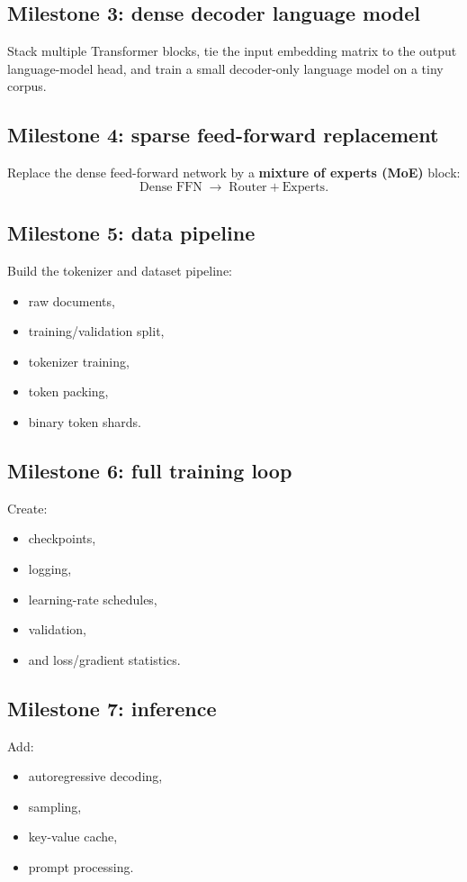 \documentclass[11pt]{article}
\begin{document}
\subsection*{Milestone 3: dense decoder language model}
Stack multiple Transformer blocks, tie the input embedding matrix to the output
language-model head, and train a small decoder-only language model on a tiny corpus.

\subsection*{Milestone 4: sparse feed-forward replacement}
Replace the dense feed-forward network by a \textbf{mixture of experts (MoE)} block:
\[
\text{Dense FFN} \;\longrightarrow\; \text{Router} + \text{Experts}.
\]

\subsection*{Milestone 5: data pipeline}
Build the tokenizer and dataset pipeline:
\begin{itemize}[leftmargin=1.5em]
    \item raw documents,
    \item training/validation split,
    \item tokenizer training,
    \item token packing,
    \item binary token shards.
\end{itemize}

\subsection*{Milestone 6: full training loop}
Create:
\begin{itemize}[leftmargin=1.5em]
    \item checkpoints,
    \item logging,
    \item learning-rate schedules,
    \item validation,
    \item and loss/gradient statistics.
\end{itemize}

\subsection*{Milestone 7: inference}
Add:
\begin{itemize}[leftmargin=1.5em]
    \item autoregressive decoding,
    \item sampling,
    \item key-value cache,
    \item prompt processing.
\end{itemize}
\end{document}
